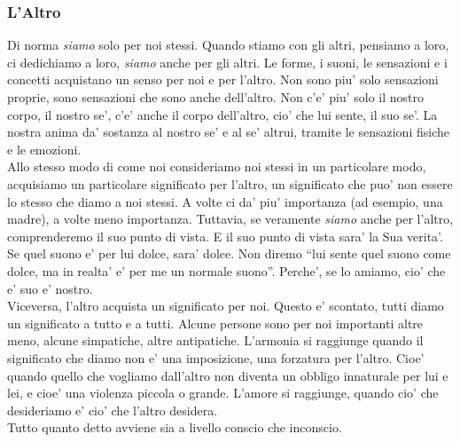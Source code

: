 \subsubsection{L'Altro}
\label{altrui}

Di norma \emph{siamo} solo per noi stessi. Quando stiamo con gli altri, pensiamo a loro, ci dedichiamo a loro, \emph{siamo} anche per gli altri. Le forme, i suoni, le sensazioni e i concetti acquistano un senso per noi e per l'altro. Non sono piu' solo sensazioni proprie, sono sensazioni che sono anche dell'altro. Non c'e' piu' solo il nostro corpo, il nostro se', c'e' anche il corpo dell'altro, cio' che lui sente, il suo se'. La nostra anima da' sostanza al nostro se' e al se' altrui, tramite le sensazioni fisiche e le emozioni. \\
Allo stesso modo di come noi consideriamo noi stessi in un particolare modo, acquisiamo un particolare significato per l'altro, un significato che puo' non essere lo stesso che diamo a noi stessi. A volte ci da' piu' importanza (ad esempio, una madre), a volte meno importanza. Tuttavia, se veramente \emph{siamo} anche per l'altro, comprenderemo il suo punto di vista. E il suo punto di vista sara' la Sua verita'. Se quel suono e' per lui dolce, sara' dolce. Non diremo ``lui sente quel suono come dolce, ma in realta' e' per me un normale suono''. Perche', se lo amiamo, cio' che e' suo e' nostro.\\
Viceversa, l'altro acquista un significato per noi. Questo e' scontato, tutti diamo un significato a tutto e a tutti. Alcune persone sono per noi importanti altre meno, alcune simpatiche, altre antipatiche. L'armonia si raggiunge quando il significato che diamo non e' una imposizione, una forzatura per l'altro. Cioe' quando quello che vogliamo dall'altro non diventa un obbligo innaturale per lui e lei, e cioe' una violenza piccola o grande. L'amore si raggiunge, quando cio' che desideriamo e' cio' che l'altro desidera. \\
Tutto quanto detto avviene sia a livello conscio che inconscio.\\

